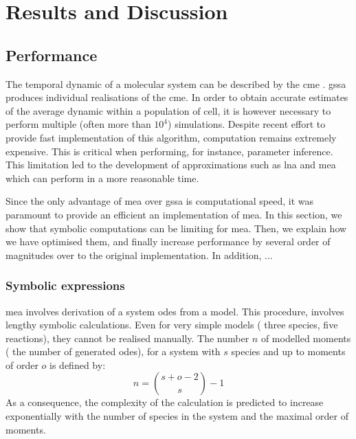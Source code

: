 \section{Results and Discussion} \label{results}



\subsection{Performance}\label{performance}
The temporal dynamic of a molecular system can be described by the \gls{cme} .
\gls{gssa}\cite{gillespie_general_1976} produces individual realisations of the \gls{cme}.
In order to obtain accurate estimates of the average dynamic within a population of cell, it is however necessary to perform multiple (often more than $10^4$) simulations.
Despite recent effort \cite{niemi_efficient_2011,dittamo_optimized_2009,komarov_accelerating_2012} to provide fast implementation of this algorithm, computation remains extremely expensive.
This is critical when performing, for instance, parameter inference.
This limitation led to the development of approximations such as \gls{lna}\cite{komorowski_bayesian_2009} and \gls{mea}\cite{ale_general_2013} which can perform in a more reasonable time.

Since the only advantage of \gls{mea} over \gls{gssa} is computational speed, it was paramount to provide an efficient an implementation of \gls{mea}.
In this section, we show that symbolic computations can be limiting for \gls{mea}.
Then, we explain how we have optimised them, and finally increase performance by several order of magnitudes over to the original \mat{} implementation.
In addition, ...\\


\subsubsection{Symbolic expressions}


\gls{mea} involves derivation of a system \gls{ode}s from a model.
This procedure\cite{ale_general_2013}, involves lengthy symbolic calculations.
Even for very simple models (\eg{} three species, five reactions), they cannot be realised manually.
The number $n$ of modelled moments (\ie{} the number of generated \gls{ode}s), for a system with $s$ species and up to moments of order $o$ is defined by:\\
\begin{equation}
n={{s+o-2} \choose {s}} -1
\end{equation}
As a consequence, the complexity of the calculation is predicted to increase exponentially with the number of species in the system and the maximal order of moments.


